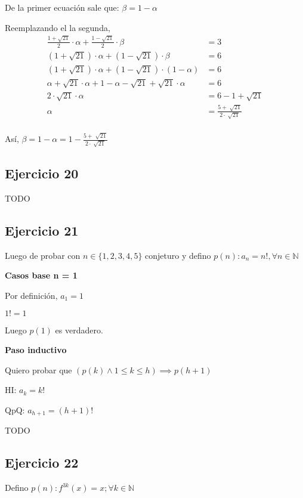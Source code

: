 De la primer ecuación sale que: $ \beta = 1- \alpha $

Reemplazando el la segunda,
\begin{align*}
    \frac{1+\sqrt{21}}{2} \cdot \alpha + \frac{1-\sqrt{21}}{2} \cdot \beta &= 3 \\
    (1+\sqrt{21}) \cdot \alpha + (1-\sqrt{21}) \cdot \beta &= 6 \\
    (1+\sqrt{21}) \cdot \alpha + (1-\sqrt{21}) \cdot (1- \alpha) &= 6 \\
    \alpha +\sqrt{21} \cdot \alpha + 1- \alpha-\sqrt{21} + \sqrt{21} \cdot \alpha &= 6 \\
    2 \cdot \sqrt{21} \cdot \alpha &= 6 - 1 + \sqrt{21} \\
    \alpha &= \frac{5+\sqrt[]{21}}{2\cdot \sqrt[]{21}} \\
\end{align*}

Así, $ \beta = 1 - \alpha = 1 - \frac{5+\sqrt[]{21}}{2\cdot \sqrt[]{21}} $

\subsection{Ejercicio 20}

TODO

\subsection{Ejercicio 21}

Luego de probar con $ n \in \{ 1,2,3,4,5 \} $ conjeturo y defino $ p(n): a_n = n!, \forall n \in \mathbb{N}$

\textbf{Casos base n = 1}

Por definición, $a_1 = 1$

$ 1! = 1$

Luego $ p(1)$ es verdadero.

\textbf{Paso inductivo}

Quiero probar que $(p(k) \wedge 1\leq k \leq h) \implies p(h+1)$

HI: $ a_k = k! $

QpQ: $ a_{h+1} = (h+1)!$

TODO

\subsection{Ejercicio 22}

Defino $ p(n): f^{3k}(x) = x; \forall k \in \mathbb{N} $

